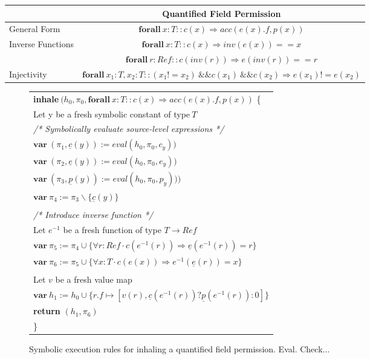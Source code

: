 \documentclass[12pt]{article}
\begin{document}
\begin{tabular}{ l || c }
& Quantified Field Permission \\ \hline
General Form & \( \mathbf{forall} \   x:T :: c(x) \Rightarrow acc(e(x).f, p(x)) \)  \\
Inverse Functions &   \( \mathbf{forall} \   x:T :: c(x) \Rightarrow inv(e(x)) == x \) \\
& \( \mathbf{forall} \   r:Ref :: c(inv(r)) \Rightarrow e(inv(r)) == r \) \\
Injectivity &  \( \mathbf{forall} \   x_1:T, x_2:T :: (x_1 != x_2)\ \&\& c(x_1) \ \&\& c(x_2)  \Rightarrow e(x_1) != e(x_2) \)\\ \hline
\end{tabular}

\newcommand*{\ident}{\hspace*{0.5cm}}
\begin{figure}[h]
  \centering
\begin{tabularx}{1\textwidth}{| X |}
\hline
\textbf{inhale}\(\ (h_0, \pi_0,  \mathbf{forall\ } x:T :: c(x) \Rightarrow acc(e(x).f, p(x))\) \{\\
\ident Let y be a fresh symbolic constant of type\( \ T\) \\
\ident \textit{/* Symbolically evaluate source-level expressions */} \\
\ident \( \mathbf{var\ } (\pi_1, \underline{c}(y)) := eval(h_0, \pi_0, c_y)) \)\\
\ident \( \mathbf{var\ } (\pi_2,\underline{e}(y)) := eval(h_0, \pi_0, e_y)) \)\\
\ident \( \mathbf{var\ } (\pi_3,\underline{p}(y)) := eval(h_0, \pi_0, p_y))) \)\\
\ident \( \mathbf{var\ } \pi_4 := \pi_3 \backslash \{\underline{c}(y)\} \)\\
\\
\ident \textit{/* Introduce inverse function */}\\
\ident Let  \(e^{-1}\)  be a fresh function of type  \(T \rightarrow Ref\) \\
\ident \(  \mathbf{var\ } \pi_5 :=  \pi_4 \cup \{\forall r: Ref \cdot c(e^{-1}(r))  \Rightarrow \underline{e}(e^{-1}(r)) = r \} \) \\
\ident \(  \mathbf{var\ } \pi_6 :=  \pi_5 \cup \{\forall x:T \cdot c(e(x))  \Rightarrow e^{-1}(\underline{e}(r)) = x \}  \) \\
\\
\ident Let  \(v\)  be a fresh value map \\
\ident \( \mathbf{var\ } h_1 :=  h_0 \cup \{r.f \mapsto [v(r), \underline{c}(e^{-1}(r)) ? \underline{p}(e^{-1}(r)) : 0] \}  \) \\
\ident \textbf{return} \( (h_1, \pi_6) \) \\
\}\\ \hline
\end{tabularx}
\caption[Inhaling a Quantified Field Permission]
   {Symbolic execution rules for inhaling a quantified field permission. Eval. Check...}
\end{figure}
\end{document}
